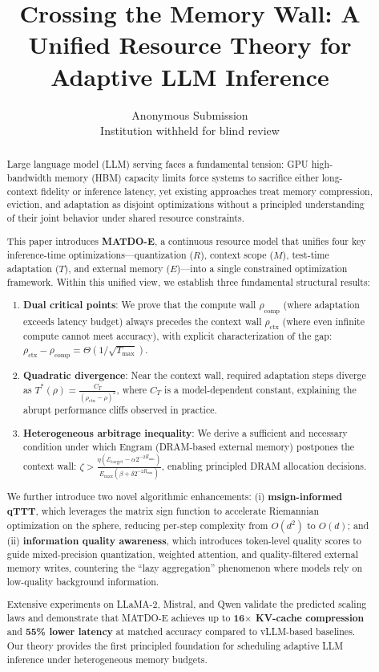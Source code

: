 \documentclass[11pt,a4paper]{article}
\author{Anonymous Submission\\Institution withheld for blind review}
\title{Crossing the Memory Wall: A Unified Resource Theory for Adaptive LLM Inference}
\date{}
\theoremstyle{plain}
\theoremstyle{definition}
\begin{document}
\maketitle

\begin{abstract}
Large language model (LLM) serving faces a fundamental tension: GPU high-bandwidth memory (HBM) capacity limits force systems to sacrifice either long-context fidelity or inference latency, yet existing approaches treat memory compression, eviction, and adaptation as disjoint optimizations without a principled understanding of their joint behavior under shared resource constraints.

This paper introduces \textbf{MATDO-E}, a continuous resource model that unifies four key inference-time optimizations---quantization ($R$), context scope ($M$), test-time adaptation ($T$), and external memory ($E$)---into a single constrained optimization framework. Within this unified view, we establish three fundamental structural results:
\begin{enumerate}
    \item \textbf{Dual critical points}: We prove that the compute wall $\rho_{\text{comp}}$ (where adaptation exceeds latency budget) always precedes the context wall $\rho_{\text{ctx}}$ (where even infinite compute cannot meet accuracy), with explicit characterization of the gap: $\rho_{\text{ctx}} - \rho_{\text{comp}} = \Theta(1/\sqrt{T_{\max}})$.
    \item \textbf{Quadratic divergence}: Near the context wall, required adaptation steps diverge as $T^*(\rho) = \frac{C_T}{(\rho_{\text{ctx}}-\rho)^2}$, where $C_T$ is a model-dependent constant, explaining the abrupt performance cliffs observed in practice.
    \item \textbf{Heterogeneous arbitrage inequality}: We derive a sufficient and necessary condition under which Engram (DRAM-based external memory) postpones the context wall: $\zeta > \frac{\eta(\mathcal{E}_{\text{target}} - \alpha 2^{-2R_{\min}})}{E_{\max}(\beta + \delta 2^{-2R_{\min}})}$, enabling principled DRAM allocation decisions.
\end{enumerate}
We further introduce two novel algorithmic enhancements: (i) \textbf{msign-informed qTTT}, which leverages the matrix sign function to accelerate Riemannian optimization on the sphere, reducing per-step complexity from $O(d^2)$ to $O(d)$; and (ii) \textbf{information quality awareness}, which introduces token-level quality scores to guide mixed-precision quantization, weighted attention, and quality-filtered external memory writes, countering the ``lazy aggregation'' phenomenon where models rely on low-quality background information.

Extensive experiments on LLaMA-2, Mistral, and Qwen validate the predicted scaling laws and demonstrate that MATDO-E achieves up to \textbf{16$\times$ KV-cache compression} and \textbf{55\% lower latency} at matched accuracy compared to vLLM-based baselines. Our theory provides the first principled foundation for scheduling adaptive LLM inference under heterogeneous memory budgets.
\end{abstract}
\end{document}
